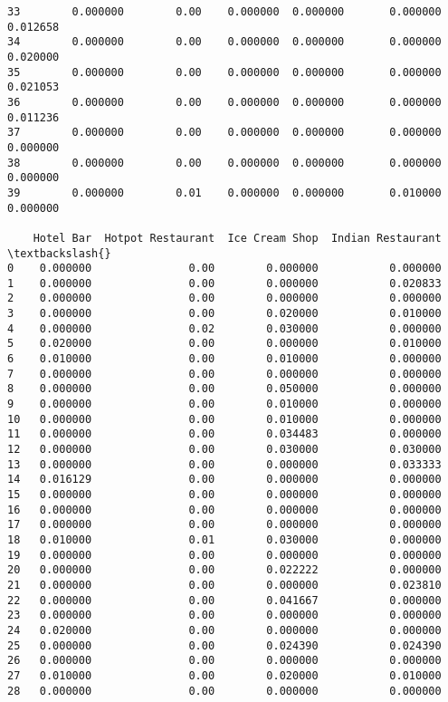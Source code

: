 \documentclass[11pt]{article}
\begin{document}
\begin{tcolorbox}[breakable, size=fbox, boxrule=.5pt, pad at break*=1mm, opacityfill=0]
\begin{Verbatim}[commandchars=\\\{\}]
33        0.000000        0.00    0.000000  0.000000       0.000000  0.012658
34        0.000000        0.00    0.000000  0.000000       0.000000  0.020000
35        0.000000        0.00    0.000000  0.000000       0.000000  0.021053
36        0.000000        0.00    0.000000  0.000000       0.000000  0.011236
37        0.000000        0.00    0.000000  0.000000       0.000000  0.000000
38        0.000000        0.00    0.000000  0.000000       0.000000  0.000000
39        0.000000        0.01    0.000000  0.000000       0.010000  0.000000

    Hotel Bar  Hotpot Restaurant  Ice Cream Shop  Indian Restaurant  \textbackslash{}
0    0.000000               0.00        0.000000           0.000000
1    0.000000               0.00        0.000000           0.020833
2    0.000000               0.00        0.000000           0.000000
3    0.000000               0.00        0.020000           0.010000
4    0.000000               0.02        0.030000           0.000000
5    0.020000               0.00        0.000000           0.010000
6    0.010000               0.00        0.010000           0.000000
7    0.000000               0.00        0.000000           0.000000
8    0.000000               0.00        0.050000           0.000000
9    0.000000               0.00        0.010000           0.000000
10   0.000000               0.00        0.010000           0.000000
11   0.000000               0.00        0.034483           0.000000
12   0.000000               0.00        0.030000           0.030000
13   0.000000               0.00        0.000000           0.033333
14   0.016129               0.00        0.000000           0.000000
15   0.000000               0.00        0.000000           0.000000
16   0.000000               0.00        0.000000           0.000000
17   0.000000               0.00        0.000000           0.000000
18   0.010000               0.01        0.030000           0.000000
19   0.000000               0.00        0.000000           0.000000
20   0.000000               0.00        0.022222           0.000000
21   0.000000               0.00        0.000000           0.023810
22   0.000000               0.00        0.041667           0.000000
23   0.000000               0.00        0.000000           0.000000
24   0.020000               0.00        0.000000           0.000000
25   0.000000               0.00        0.024390           0.024390
26   0.000000               0.00        0.000000           0.000000
27   0.010000               0.00        0.020000           0.010000
28   0.000000               0.00        0.000000           0.000000

\end{Verbatim}
\end{tcolorbox}
\end{document}
